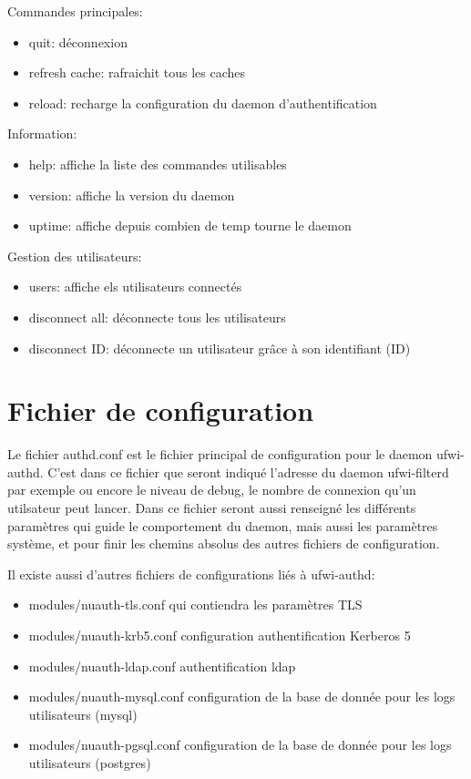 \documentclass[12pt]{report}
\begin{document}
\begin{itemize}
Commandes principales:
\begin{itemize}
  \item quit: déconnexion
  \item refresh cache: rafraichit tous les caches
  \item reload: recharge la configuration du daemon d'authentification 
\end{itemize}
Information:
\begin{itemize}
  \item help: affiche la liste des commandes utilisables
  \item version: affiche la version du daemon
  \item uptime: affiche depuis combien de temp tourne le daemon 
\end{itemize}
Gestion des utilisateurs:
\begin{itemize}
  \item users: affiche els utilisateurs connectés
  \item disconnect all: déconnecte tous les utilisateurs
  \item disconnect ID: déconnecte un utilisateur grâce à son identifiant (ID) 
\end{itemize}

\section{Fichier de configuration}

Le fichier authd.conf est le fichier principal de configuration pour le
daemon ufwi-authd. C'est dans ce fichier que seront indiqué l'adresse du daemon ufwi-filterd 
par exemple ou encore le niveau de debug, le nombre de connexion qu'un utilsateur peut lancer.
Dans ce fichier seront aussi renseigné les différents paramètres qui guide le comportement du 
daemon, mais aussi les paramètres système, et pour finir les chemins absolus des autres fichiers
de configuration.

Il existe aussi d'autres fichiers de configurations liés à ufwi-authd:
\begin{itemize}
  \item modules/nuauth-tls.conf qui contiendra les paramètres TLS
  \item modules/nuauth-krb5.conf configuration authentification Kerberos 5
  \item modules/nuauth-ldap.conf authentification ldap
  \item modules/nuauth-mysql.conf configuration de la base de donnée pour les logs utilisateurs (mysql)
  \item modules/nuauth-pgsql.conf configuration de la base de donnée pour les logs utilisateurs (postgres) 
\end{itemize}
 

\end{itemize}
\end{document}
